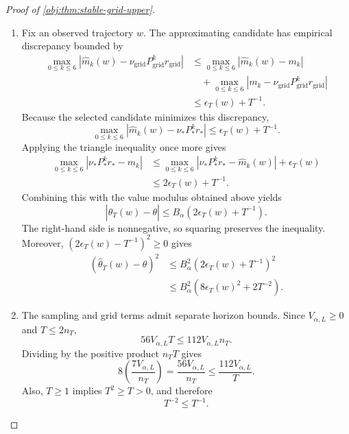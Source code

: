 \begin{proof}[Proof of \cref{obj:thm:stable-grid-upper}]
\begin{enumerate}
\item Fix an observed trajectory \(w\). The approximating candidate has empirical discrepancy bounded by
\[
\begin{aligned}
\max_{0\le k\le6}
|\widehat m_k(w)-\nu_{\mathrm{grid}}P_{\mathrm{grid}}^kr_{\mathrm{grid}}|
&\le
\max_{0\le k\le6}|\widehat m_k(w)-m_k|\\
&\quad+
\max_{0\le k\le6}
|m_k-\nu_{\mathrm{grid}}P_{\mathrm{grid}}^kr_{\mathrm{grid}}|\\
&\le\epsilon_T(w)+T^{-1}.
\end{aligned}
\]
Because the selected candidate minimizes this discrepancy,
\[
\max_{0\le k\le6}
|\widehat m_k(w)-\nu_*P_*^kr_*|
\le\epsilon_T(w)+T^{-1}.
\]
Applying the triangle inequality once more gives
\[
\begin{aligned}
\max_{0\le k\le6}|\nu_*P_*^kr_*-m_k|
&\le
\max_{0\le k\le6}|\nu_*P_*^kr_*-\widehat m_k(w)|
+\epsilon_T(w)\\
&\le2\epsilon_T(w)+T^{-1}.
\end{aligned}
\]
Combining this with the value modulus obtained above yields
\[
|\widehat\theta_T(w)-\theta|
\le
B_\alpha(2\epsilon_T(w)+T^{-1}).
\]
The right-hand side is nonnegative, so squaring preserves the inequality. Moreover,
\((2\epsilon_T(w)-T^{-1})^2\ge0\) gives
\[
\begin{aligned}
(\widehat\theta_T(w)-\theta)^2
&\le
B_\alpha^2(2\epsilon_T(w)+T^{-1})^2\\
&\le
B_\alpha^2\left(8\epsilon_T(w)^2+2T^{-2}\right).
\end{aligned}
\]

\item The sampling and grid terms admit separate horizon bounds. Since
\(V_{\alpha,L}\ge0\) and \(T\le2n_T\),
\[
56V_{\alpha,L}T
\le112V_{\alpha,L}n_T.
\]
Dividing by the positive product \(n_TT\) gives
\[
8\left(\frac{7V_{\alpha,L}}{n_T}\right)
=
\frac{56V_{\alpha,L}}{n_T}
\le
\frac{112V_{\alpha,L}}T.
\]
Also, \(T\ge1\) implies \(T^2\ge T>0\), and therefore
\[
T^{-2}\le T^{-1}.
\]


\end{enumerate}
\end{proof}
